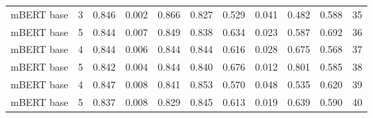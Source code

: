 \begin{tabular}{lrrrrrrrrrr}
        mBERT base &      3 &  0.846 &                 0.002 &          0.866 &                  0.827 &                   0.529 &                 0.041 &           0.482 &                  0.588 &                      35 \\
        mBERT base &      5 &  0.844 &                 0.007 &          0.849 &                  0.838 &                   0.634 &                 0.023 &           0.587 &                  0.692 &                      36 \\
        mBERT base &      4 &  0.844 &                 0.006 &          0.844 &                  0.844 &                   0.616 &                 0.028 &           0.675 &                  0.568 &                      37 \\
        mBERT base &      5 &  0.842 &                 0.004 &          0.844 &                  0.840 &                   0.676 &                 0.012 &           0.801 &                  0.585 &                      38 \\
        mBERT base &      4 &  0.847 &                 0.008 &          0.841 &                  0.853 &                   0.570 &                 0.048 &           0.535 &                  0.620 &                      39 \\
        mBERT base &      5 &  0.837 &                 0.008 &          0.829 &                  0.845 &                   0.613 &                 0.019 &           0.639 &                  0.590 &                      40 \\
\bottomrule
\end{tabular}
